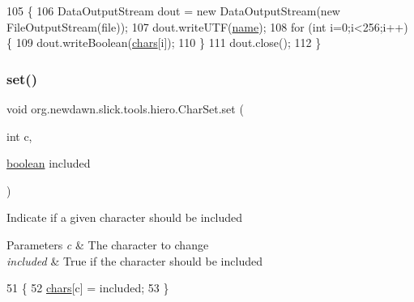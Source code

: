 \begin{DoxyCode}
105                                                    \{
106         DataOutputStream dout = \textcolor{keyword}{new} DataOutputStream(\textcolor{keyword}{new} FileOutputStream(file));
107         dout.writeUTF(\mbox{\hyperlink{classorg_1_1newdawn_1_1slick_1_1tools_1_1hiero_1_1_char_set_aff26a369817bc815327582f0b7ac215e}{name}});
108         \textcolor{keywordflow}{for} (\textcolor{keywordtype}{int} i=0;i<256;i++) \{
109             dout.writeBoolean(\mbox{\hyperlink{classorg_1_1newdawn_1_1slick_1_1tools_1_1hiero_1_1_char_set_abc7c29b42b721d99a1cfc9d2ae97de07}{chars}}[i]);
110         \}
111         dout.close();
112     \}
\end{DoxyCode}
\mbox{\label{classorg_1_1newdawn_1_1slick_1_1tools_1_1hiero_1_1_char_set_a9a241ad84da5627b20bd30502a37de02}} 
\subsubsection{\texorpdfstring{set()}{set()}}
{\footnotesize\ttfamily void org.\+newdawn.\+slick.\+tools.\+hiero.\+Char\+Set.\+set (\begin{DoxyParamCaption}\item[{int}]{c,  }\item[{\mbox{\hyperlink{classorg_1_1newdawn_1_1slick_1_1tools_1_1hiero_1_1_char_set_a45913b69f90ce574d65a9023e9d1257c}{boolean}}}]{included }\end{DoxyParamCaption})\hspace{0.3cm}{\ttfamily [inline]}}

Indicate if a given character should be included


\begin{DoxyParams}{Parameters}
{\em c} & The character to change \\
\hline
{\em included} & True if the character should be included \\
\hline
\end{DoxyParams}

\begin{DoxyCode}
51                                              \{
52         \mbox{\hyperlink{classorg_1_1newdawn_1_1slick_1_1tools_1_1hiero_1_1_char_set_abc7c29b42b721d99a1cfc9d2ae97de07}{chars}}[c] = included;
53     \}
\end{DoxyCode}
\mbox{\label{classorg_1_1newdawn_1_1slick_1_1tools_1_1hiero_1_1_char_set_a903427b522ec1db1ff92f00a819236fa}} 
